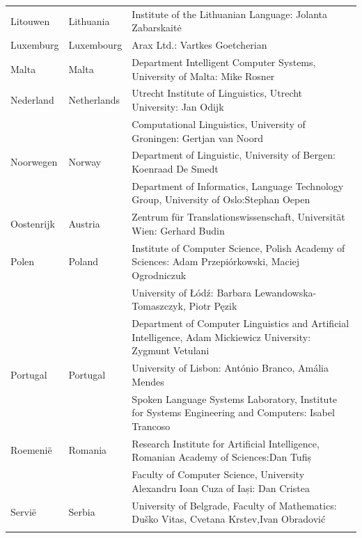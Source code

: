 \begin{longtable}{@{}llp{113mm}@{}}
  Litouwen & \textcolor{grey1}{Lithuania} & Institute of the Lithuanian Language: Jolanta Zabarskaitė\\ \addlinespace
  Luxemburg & \textcolor{grey1}{Luxembourg} & Arax Ltd.: Vartkes Goetcherian\\ \addlinespace
  Malta & \textcolor{grey1}{Malta} & Department Intelligent Computer Systems, University of Malta: Mike Rosner\\ \addlinespace
  Nederland & \textcolor{grey1}{Netherlands} & Utrecht Institute of Linguistics, Utrecht University: Jan Odijk\\ \addlinespace
  & & Computational Linguistics, University of Groningen: Gertjan van Noord\\ \addlinespace
  Noorwegen & \textcolor{grey1}{Norway} & Department of Linguistic, University of Bergen: Koenraad De Smedt\\ \addlinespace
  & & Department of Informatics, Language Technology Group, University of Oslo:\newline Stephan Oepen \\ \addlinespace
  Oostenrijk& \textcolor{grey1}{Austria} & Zentrum für Translationswissenschaft, Universität Wien: Gerhard Budin\\ \addlinespace
  Polen & \textcolor{grey1}{Poland} & Institute of Computer Science, Polish Academy of Sciences: Adam Przepiórkowski, Maciej Ogrodniczuk \\ \addlinespace
  & & University of Łódź: Barbara Lewandowska-Tomaszczyk, Piotr Pęzik\\ \addlinespace
  & & Department of Computer Linguistics and Artificial Intelligence, Adam Mickiewicz University: Zygmunt Vetulani \\ \addlinespace
  Portugal & \textcolor{grey1}{Portugal} & University of Lisbon: António Branco, Amália Mendes \\ \addlinespace
  & & Spoken Language Systems Laboratory, Institute for Systems Engineering and Computers: Isabel Trancoso \\ \addlinespace
  Roemeni{\"e} & \textcolor{grey1}{Romania} & Research Institute for Artificial Intelligence, Romanian Academy of Sciences:\newline Dan Tufiș \\ \addlinespace
  & & Faculty of Computer Science, University Alexandru Ioan Cuza of Iași: Dan Cristea  \\ \addlinespace
  Servi{\"e} & \textcolor{grey1}{Serbia} & University of Belgrade, Faculty of Mathematics: Duško Vitas, Cvetana Krstev,\newline Ivan Obradović \\ \addlinespace

\end{longtable}
